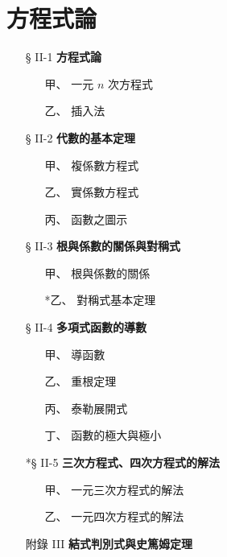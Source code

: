 \section{方程式論}\label{sec:b6s-ch2}

\begin{center}
\begin{minipage}{0.75\textwidth}
\begin{itemize}[leftmargin=2em, itemsep=0.3em]
  \item[§ II-1] \textbf{方程式論}
  \begin{itemize}[leftmargin=2em, itemsep=0.2em]
    \item[甲、] 一元 $n$ 次方程式
    \item[乙、] 插入法
  \end{itemize}
  \item[§ II-2] \textbf{代數的基本定理}
  \begin{itemize}[leftmargin=2em, itemsep=0.2em]
    \item[甲、] 複係數方程式
    \item[乙、] 實係數方程式
    \item[丙、] 函數之圖示
  \end{itemize}
  \item[§ II-3] \textbf{根與係數的關係與對稱式}
  \begin{itemize}[leftmargin=2em, itemsep=0.2em]
    \item[甲、] 根與係數的關係
    \item[*乙、] 對稱式基本定理
  \end{itemize}
  \item[§ II-4] \textbf{多項式函數的導數}
  \begin{itemize}[leftmargin=2em, itemsep=0.2em]
    \item[甲、] 導函數
    \item[乙、] 重根定理
    \item[丙、] 泰勒展開式
    \item[丁、] 函數的極大與極小
  \end{itemize}
  \item[*§ II-5] \textbf{三次方程式、四次方程式的解法}
  \begin{itemize}[leftmargin=2em, itemsep=0.2em]
    \item[甲、] 一元三次方程式的解法
    \item[乙、] 一元四次方程式的解法
  \end{itemize}
  \item[附錄 III] \textbf{結式判別式與史篤姆定理}
\end{itemize}
\end{minipage}
\end{center}

